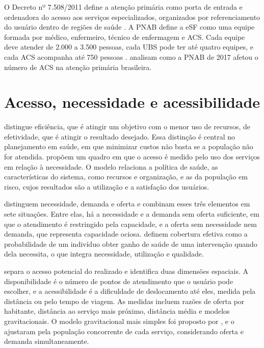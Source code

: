 \documentclass[12pt,a4paper,oneside]{report}
\begin{document}
O Decreto nº 7.508/2011 define a atenção primária como porta de entrada e ordenadora do acesso aos
serviços especializados, organizados por referenciamento do usuário dentro de regiões de saúde
\citep{brasil2011}. A PNAB define a eSF como uma equipe formada
por médico, enfermeiro, técnico de enfermagem e ACS. Cada equipe deve atender de 2.000 a 3.500 pessoas,
cada UBS pode ter até quatro equipes, e cada ACS acompanha até 750 pessoas \citep{pnab2017}. \citet{freire2021} analisam como a PNAB
de 2017 afetou o número de ACS na atenção primária brasileira.

\section{Acesso, necessidade e acessibilidade}

\citet{simon1955} distingue eficiência, que é atingir um objetivo com o menor uso de recursos, de
efetividade, que é atingir o resultado desejado. Essa distinção é central no planejamento em saúde, em
que minimizar custos não basta se a população não for atendida. \citet{aday1974} propõem um quadro em
que o acesso é medido pelo uso dos serviços em relação à necessidade. O modelo relaciona a política de
saúde, as características do sistema, como recursos e organização, e as da população em risco, cujos
resultados são a utilização e a satisfação dos usuários.

\citet{santana2023} distinguem necessidade, demanda e oferta e combinam esses três elementos em sete
situações. Entre elas, há a necessidade e a demanda sem oferta suficiente, em que o atendimento é
restringido pela capacidade, e a oferta sem necessidade nem demanda, que representa capacidade ociosa.
\citet{shengelia2005} definem cobertura efetiva como a probabilidade de um indivíduo obter ganho de saúde
de uma intervenção quando dela necessita, o que integra necessidade, utilização e qualidade.

\citet{guagliardo2004} separa o acesso potencial do realizado e identifica duas dimensões espaciais. A
disponibilidade é o número de pontos de atendimento que o usuário pode escolher, e a acessibilidade é a
dificuldade de deslocamento até eles, medida pela distância ou pelo tempo de viagem. As medidas incluem razões de oferta por
habitante, distância ao serviço mais próximo, distância média e modelos gravitacionais. O modelo
gravitacional mais simples foi proposto por \citet{hansen1959}, e \citet{joseph1982} o ajustaram pela
população concorrente de cada serviço, considerando oferta e demanda simultaneamente.
\end{document}
